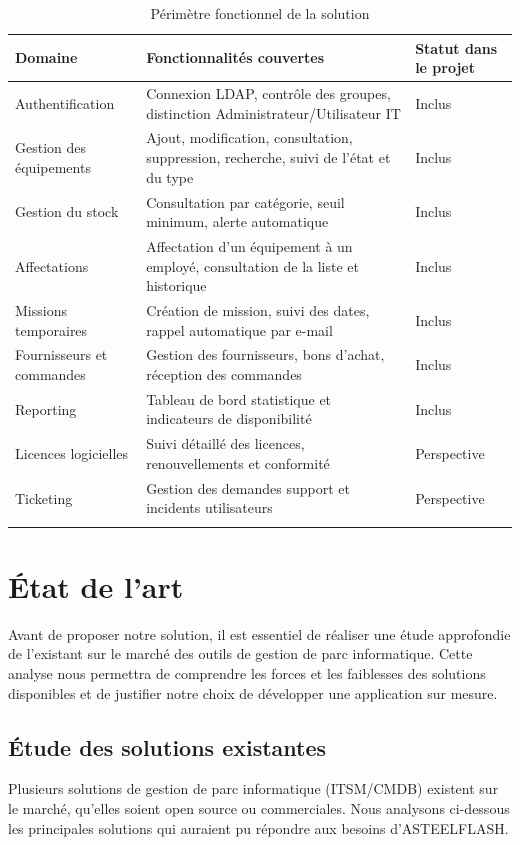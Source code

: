 \begin{longtable}{|m{4cm}|m{6cm}|m{4cm}|}
\hline
\textbf{Domaine} & \textbf{Fonctionnalités couvertes} & \textbf{Statut dans le projet} \\
\hline
\endhead
\endfoot
\endlastfoot
\hline
Authentification & Connexion LDAP, contrôle des groupes, distinction Administrateur/Utilisateur IT & Inclus \\
\hline
Gestion des équipements & Ajout, modification, consultation, suppression, recherche, suivi de l'état et du type & Inclus \\
\hline
Gestion du stock & Consultation par catégorie, seuil minimum, alerte automatique & Inclus \\
\hline
Affectations & Affectation d'un équipement à un employé, consultation de la liste et historique & Inclus \\
\hline
Missions temporaires & Création de mission, suivi des dates, rappel automatique par e-mail & Inclus \\
\hline
Fournisseurs et commandes & Gestion des fournisseurs, bons d'achat, réception des commandes & Inclus \\
\hline
Reporting & Tableau de bord statistique et indicateurs de disponibilité & Inclus \\
\hline
Licences logicielles & Suivi détaillé des licences, renouvellements et conformité & Perspective \\
\hline
Ticketing & Gestion des demandes support et incidents utilisateurs & Perspective \\
\hline
\captionsetup{justification=centering,margin=1cm}
\caption{Périmètre fonctionnel de la solution}
\end{longtable}
\section{État de l'art}

Avant de proposer notre solution, il est essentiel de réaliser une étude approfondie de l'existant sur le marché des outils de gestion de parc informatique. Cette analyse nous permettra de comprendre les forces et les faiblesses des solutions disponibles et de justifier notre choix de développer une application sur mesure.

\subsection{Étude des solutions existantes}

Plusieurs solutions de gestion de parc informatique (ITSM/CMDB) existent sur le marché, qu'elles soient open source ou commerciales. Nous analysons ci-dessous les principales solutions qui auraient pu répondre aux besoins d'ASTEELFLASH.

